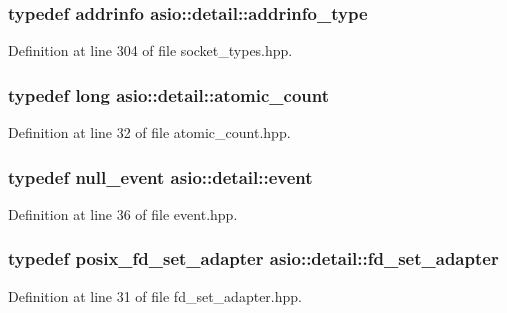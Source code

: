 \subsubsection[{addrinfo\+\_\+type}]{\setlength{\rightskip}{0pt plus 5cm}typedef addrinfo {\bf asio\+::detail\+::addrinfo\+\_\+type}}\label{namespaceasio_1_1detail_ad8df56a17e3aa9ce2ad251fb76426e67}


Definition at line 304 of file socket\+\_\+types.\+hpp.

\hypertarget{namespaceasio_1_1detail_a75f94bf579dec2f59a0c4af6c4c3606e}{}
\subsubsection[{atomic\+\_\+count}]{\setlength{\rightskip}{0pt plus 5cm}typedef long {\bf asio\+::detail\+::atomic\+\_\+count}}\label{namespaceasio_1_1detail_a75f94bf579dec2f59a0c4af6c4c3606e}


Definition at line 32 of file atomic\+\_\+count.\+hpp.

\hypertarget{namespaceasio_1_1detail_a83969c12552b8b4db0c39a9efd1e0e25}{}
\subsubsection[{event}]{\setlength{\rightskip}{0pt plus 5cm}typedef {\bf null\+\_\+event} {\bf asio\+::detail\+::event}}\label{namespaceasio_1_1detail_a83969c12552b8b4db0c39a9efd1e0e25}


Definition at line 36 of file event.\+hpp.

\hypertarget{namespaceasio_1_1detail_a349ef452bc2dc3865e797f922a468449}{}
\subsubsection[{fd\+\_\+set\+\_\+adapter}]{\setlength{\rightskip}{0pt plus 5cm}typedef {\bf posix\+\_\+fd\+\_\+set\+\_\+adapter} {\bf asio\+::detail\+::fd\+\_\+set\+\_\+adapter}}\label{namespaceasio_1_1detail_a349ef452bc2dc3865e797f922a468449}


Definition at line 31 of file fd\+\_\+set\+\_\+adapter.\+hpp.

